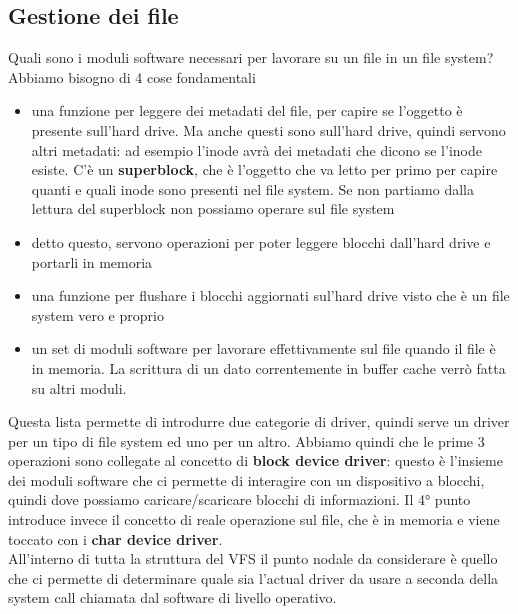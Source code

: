 \documentclass[12pt, oneside]{extbook}
\begin{document}
\subsection{Gestione dei file}
Quali sono i moduli software necessari per lavorare su un file in un file system? Abbiamo bisogno di 4 cose fondamentali
\begin{itemize}
\item una funzione per leggere dei metadati del file, per capire se l'oggetto è presente sull'hard drive. Ma anche questi sono sull'hard drive, quindi servono altri metadati: ad esempio l'inode avrà dei metadati che dicono se l'inode esiste. C'è un \textbf{superblock}, che è l'oggetto che va letto per primo per capire quanti e quali inode sono presenti nel file system. Se non partiamo dalla lettura del superblock non possiamo operare sul file system
\item detto questo, servono operazioni per poter leggere blocchi dall'hard drive e portarli in memoria
\item una funzione per flushare i blocchi aggiornati sul'hard drive visto che è un file system vero e proprio
\item un set di moduli software per lavorare effettivamente sul file quando il file è in memoria. La scrittura di un dato correntemente in buffer cache verrò fatta su altri moduli.
\end{itemize}
Questa lista permette di introdurre due categorie di driver, quindi serve un driver per un tipo di file system ed uno per un altro. Abbiamo quindi che le prime 3 operazioni sono collegate al concetto di \textbf{block device driver}: questo è l'insieme dei moduli software che ci permette di interagire con un dispositivo a blocchi, quindi dove possiamo caricare/scaricare blocchi di informazioni. Il 4° punto introduce invece il concetto di  reale operazione sul file, che è in memoria e viene toccato con i \textbf{char device driver}.\\All'interno di tutta la struttura del VFS il punto nodale da considerare è quello che ci permette di determinare quale sia l'actual driver da usare a seconda della system call chiamata dal software di livello operativo.
\end{document}
